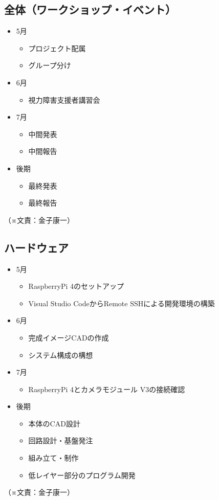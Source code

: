 \documentclass[11pt,a4paper]{report}
\newcommand{\Writer}[1]{
  \normalsize
  \begin{flushright}
    （※文責：#1）
  \end{flushright}
}
\begin{document}
\subsection{全体（ワークショップ・イベント）}
\noindent\space
\begin{itemize}
  \item 5月
  \begin{itemize}
    \item プロジェクト配属
    \item グループ分け
  \end{itemize}
  \item 6月
  \begin{itemize}
    \item 視力障害支援者講習会
  \end{itemize}
  \item 7月
  \begin{itemize}
    \item 中間発表
    \item 中間報告
  \end{itemize}
  \item 後期
  \begin{itemize}
    \item 最終発表
    \item 最終報告
  \end{itemize}
\end{itemize}
\Writer{金子康一}

\subsection{ハードウェア}
\noindent\space
\begin{itemize}
  \item 5月
  \begin{itemize}
    \item RaspberryPi 4のセットアップ
    \item Visual Studio CodeからRemote SSHによる開発環境の構築
  \end{itemize}
  \item 6月
  \begin{itemize}
    \item 完成イメージCADの作成
    \item システム構成の構想
  \end{itemize}
  \item 7月
  \begin{itemize}
    \item RaspberryPi 4とカメラモジュール V3の接続確認
  \end{itemize}
  \item 後期
  \begin{itemize}
    \item 本体のCAD設計
    \item 回路設計・基盤発注
    \item 組み立て・制作
    \item 低レイヤー部分のプログラム開発
  \end{itemize}
\end{itemize}
\Writer{金子康一}
\end{document}
